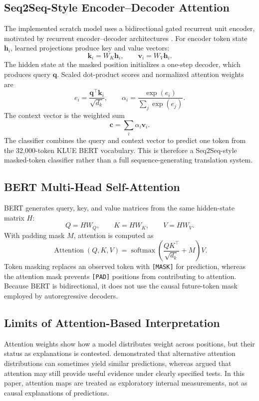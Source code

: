 \documentclass[10pt,letterpaper]{article}
\begin{document}
\subsection{Seq2Seq-Style Encoder--Decoder Attention}
The implemented scratch model uses a bidirectional gated recurrent unit encoder, motivated by recurrent encoder--decoder architectures \parencite{cho2014}. For encoder token state $\mathbf{h}_i$, learned projections produce key and value vectors:
\begin{equation}
\mathbf{k}_i=W_K\mathbf{h}_i, \qquad \mathbf{v}_i=W_V\mathbf{h}_i.
\end{equation}
The hidden state at the masked position initializes a one-step decoder, which produces query $\mathbf{q}$. Scaled dot-product scores and normalized attention weights are
\begin{equation}
e_i=\frac{\mathbf{q}^{\top}\mathbf{k}_i}{\sqrt{d_k}}, \qquad
\alpha_i=\frac{\exp(e_i)}{\sum_j\exp(e_j)}.
\end{equation}
The context vector is the weighted sum
\begin{equation}
\mathbf{c}=\sum_i\alpha_i\mathbf{v}_i.
\end{equation}
The classifier combines the query and context vector to predict one token from the 32,000-token KLUE BERT vocabulary. This is therefore a Seq2Seq-style masked-token classifier rather than a full sequence-generating translation system.

\subsection{BERT Multi-Head Self-Attention}
BERT generates query, key, and value matrices from the same hidden-state matrix $H$:
\begin{equation}
Q=HW_Q, \qquad K=HW_K, \qquad V=HW_V.
\end{equation}
With padding mask $M$, attention is computed as
\begin{equation}
\operatorname{Attention}(Q,K,V)=\operatorname{softmax}\!\left(\frac{QK^{\top}}{\sqrt{d_k}}+M\right)V.
\end{equation}
Token masking replaces an observed token with \texttt{[MASK]} for prediction, whereas the attention mask prevents \texttt{[PAD]} positions from contributing to attention. Because BERT is bidirectional, it does not use the causal future-token mask employed by autoregressive decoders.

\subsection{Limits of Attention-Based Interpretation}
Attention weights show how a model distributes weight across positions, but their status as explanations is contested. \textcite{jain2019} demonstrated that alternative attention distributions can sometimes yield similar predictions, whereas \textcite{wiegreffe2019} argued that attention may still provide useful evidence under clearly specified tests. In this paper, attention maps are treated as exploratory internal measurements, not as causal explanations of predictions.
\end{document}
